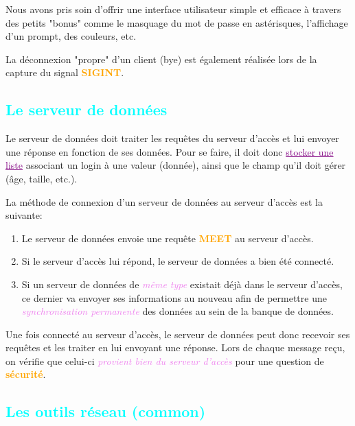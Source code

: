 \documentclass[a4paper]{article}
\let\oldsubsection\subsection{}
\renewcommand{\subsection}[1]{\textcolor{cyan}{\oldsubsection{#1}}}
\let\oldtextbf\textbf
\renewcommand{\textbf}[1]{\textcolor{orange}{\oldtextbf{#1}}}
\let\oldunderline\underline{}
\renewcommand{\underline}[1]{\textcolor{purple}{\oldunderline{#1}}}
\let\oldtextit\textit
\renewcommand{\textit}[1]{\textcolor{violet}{\oldtextit{#1}}}
\begin{document}
Nous avons pris soin d'offrir une interface utilisateur simple et efficace à travers des petits "bonus" comme le masquage du mot de passe en astérisques, l'affichage d'un prompt, des couleurs, etc.

La déconnexion "propre" d'un client (bye) est également réalisée lors de la capture du signal \textbf{SIGINT}.

\subsection{Le serveur de données}

Le serveur de données doit traiter les requêtes du serveur d'accès et lui envoyer une réponse en fonction de ses données. Pour se faire, il doit donc \underline{stocker une liste} associant un login à une valeur (donnée), ainsi que le champ qu'il doit gérer (âge, taille, etc.).

La méthode de connexion d'un serveur de données au serveur d'accès est la suivante:
\begin{enumerate}
    \item Le serveur de données envoie une requête \textbf{MEET} au serveur d'accès.
    \item Si le serveur d'accès lui répond, le serveur de données a bien été connecté.
    \item Si un serveur de données de \textit{même type} existait déjà dans le serveur d'accès, ce dernier va envoyer ses informations au nouveau afin de permettre une \textit{synchronisation permanente} des données au sein de la banque de données.
\end{enumerate}

Une fois connecté au serveur d'accès, le serveur de données peut donc recevoir ses requêtes et les traiter en lui envoyant une réponse. Lors de chaque message reçu, on vérifie que celui-ci \textit{provient bien du serveur d'accès} pour une question de \textbf{sécurité}.

\subsection{Les outils réseau (common)}
\end{document}
